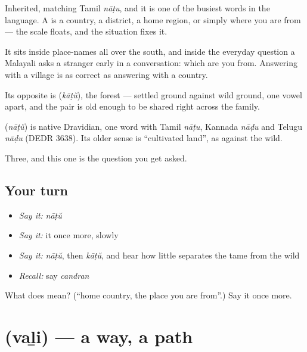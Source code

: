Inherited, matching Tamil \emph{nāṭu}, and it is one of the busiest words in the language. A  is a country, a district, a home region, or simply where you are from — the scale floats, and the situation fixes it.

It sits inside place-names all over the south, and inside the everyday question a Malayali asks a stranger early in a conversation: which  are you from. Answering with a village is as correct as answering with a country.

Its opposite is  (\emph{kāṭŭ}), the forest — settled ground against wild ground, one vowel apart, and the pair is old enough to be shared right across the family.

\begin{cousinweb}
\textbf{} (\emph{nāṭŭ}) is native Dravidian, one word with Tamil \emph{nāṭu}, Kannada \emph{nāḍu} and Telugu \emph{nāḍu} (DEDR 3638). Its older sense is \textquotedblleft{}cultivated land\textquotedblright{}, as against the wild.
\end{cousinweb}

\begin{grammarlens}[title={What you've built}]
Three, and this one is the question you get asked.
\end{grammarlens}

\subsection*{Your turn}
\begin{itemize}
\raggedright
  \item \emph{Say it:} \emph{nāṭŭ}
  \item \emph{Say it:} it once more, slowly
  \item \emph{Say it:} \emph{nāṭŭ}, then \emph{kāṭŭ}, and hear how little separates the tame from the wild
  \item \emph{Recall:} say \emph{candran}
\end{itemize}

\begin{tcolorbox}[breakable,colback=teal!4,colframe=teal!35!black,title={Before you move on}]
What does  mean? (\textquotedblleft{}home country, the place you are from\textquotedblright{}.) Say it once more.
\end{tcolorbox}
\section[\texorpdfstring{\ml{വഴി} (vaḻi)}{വഴി (vaḻi)}]{ (vaḻi) — a way, a path}

